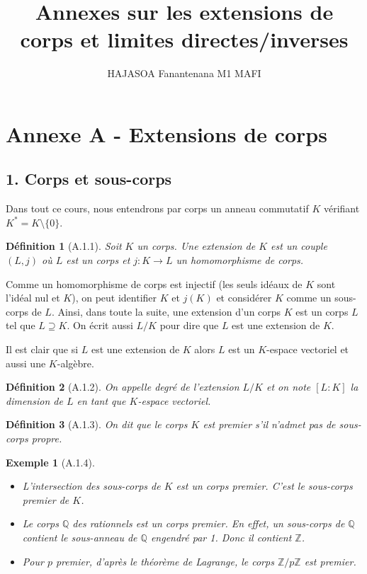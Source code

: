\documentclass[12pts,a4paper]{report}
\title{\LARGE\textbf{Annexes sur les extensions de corps et limites directes/inverses}}
\author{HAJASOA Fanantenana M1 MAFI}
\date{}
\newtheorem{definition}{Définition}
\newtheorem{exemple}{Exemple}
\begin{document}
\Large
\maketitle

\section*{Annexe A - Extensions de corps}

\subsection*{1. Corps et sous-corps}

Dans tout ce cours, nous entendrons par corps un anneau commutatif \( K \) vérifiant \( K^* = K \setminus \{0\} \).

\begin{definition}[A.1.1]
Soit \( K \) un corps. Une extension de \( K \) est un couple \((L,j)\) où \( L \) est un corps et \( j : K \to L \) un homomorphisme de corps.
\end{definition}
Comme un homomorphisme de corps est injectif (les seuls idéaux de \( K \) sont l'idéal nul et \( K \)), on peut identifier \( K \) et \( j(K) \) et considérer \( K \) comme un sous-corps de \( L \). Ainsi, dans toute la suite, une extension d'un corps \( K \) est un corps \( L \) tel que \( L \supseteq K \). On écrit aussi \( L/K \) pour dire que \( L \) est une extension de \( K \).

Il est clair que si \( L \) est une extension de \( K \) alors \( L \) est un \( K \)-espace vectoriel et aussi une \( K \)-algèbre.

\begin{definition}[A.1.2]
On appelle degré de l'extension \( L/K \) et on note \([L:K]\) la dimension de \( L \) en tant que \( K \)-espace vectoriel.
\end{definition}

\begin{definition}[A.1.3]
On dit que le corps \( K \) est premier s'il n'admet pas de sous-corps propre.
\end{definition}

\begin{exemple}[A.1.4]
\begin{itemize}
\item L'intersection des sous-corps de \( K \) est un corps premier. C'est le sous-corps premier de \( K \).
\item Le corps \( \mathbb{Q} \) des rationnels est un corps premier. En effet, un sous-corps de \( \mathbb{Q} \) contient le sous-anneau de \( \mathbb{Q} \) engendré par 1. Donc il contient \( \mathbb{Z} \).
\item Pour \( p \) premier, d'après le théorème de Lagrange, le corps \( \mathbb{Z}/p\mathbb{Z} \) est premier.
\end{itemize}
\end{exemple}
\end{document}
